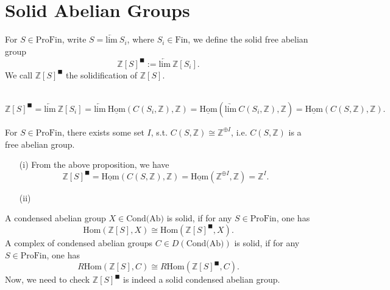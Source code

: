 \documentclass[UTF8,12,a4paper]{ctexart}
\theoremstyle{definition}
\begin{document}
\newpage
\section{Solid Abelian Groups}
\dfn 
For $S\in\text{ProFin}$, write $S=\underleftarrow{\text{lim}}\ 
 S_i$, where $S_i\in \text{Fin}$, we define the solid free abelian group
 $$
 \mathbb{Z}[S]^{\blacksquare}:=\underleftarrow{\text{lim}}\ \mathbb{Z}[S_i].
 $$
We call $ \mathbb{Z}[S]^{\blacksquare}$ the solidification of $\mathbb{Z}[S]$.

\rem~\\
$
 \mathbb{Z}[S]^{\blacksquare}=\underleftarrow{\text{lim}}\ \mathbb{Z}[S_i]
 =\underleftarrow{\text{lim}}\ \underline{\text{Hom}}(C(S_i,\mathbb{Z}),\mathbb{Z})
 =\underline{\text{Hom}}(\underrightarrow{\text{lim}}\ C(S_i,\mathbb{Z}),\mathbb{Z})
 =\underline{\text{Hom}}(C(S,\mathbb{Z}),\mathbb{Z}).
$

\prop 
For $S\in\text{ProFin}$, there exists some set $I$, s.t. $C(S,\mathbb{Z})\cong \mathbb{Z}^{\oplus I}$, i.e. $C(S,\mathbb{Z})$ is a free abelian group.
\rem
\begin{itemize}
	\item [(i)]From the above proposition, we have
	$$\mathbb{Z}[S]^{\blacksquare}=\underline{\text{Hom}}(C(S,\mathbb{Z}),\mathbb{Z})=\underline{\text{Hom}}(\mathbb{Z}^{\oplus I},\mathbb{Z})=\mathbb{Z}^I.$$
	\item [(ii)]
\end{itemize}

\dfn 
A condensed abelian group $X\in\text{Cond(Ab)}$ is solid, if for any $S\in\text{ProFin}$, one has
$$
\text{Hom}(\mathbb{Z}[S],X)\cong \text{Hom}(\mathbb{Z}[S]^{\blacksquare},X).
$$
A complex of condensed abelian groups $C\in D(\text{Cond(Ab)})$ is solid, if for any $S\in\text{ProFin}$, one has
$$
R\text{Hom}(\mathbb{Z}[S],C)\cong R\text{Hom}(\mathbb{Z}[S]^{\blacksquare},C).
$$
Now, we need to check $\mathbb{Z}[S]^{\blacksquare}$ is indeed a solid condensed abelian group.
\end{document}
